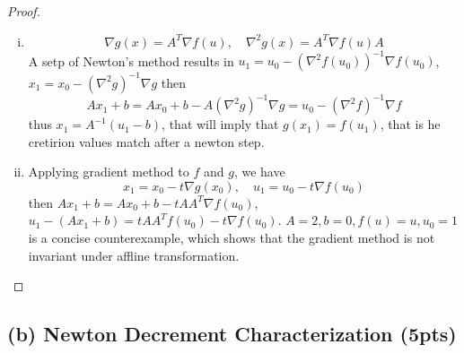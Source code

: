 \documentclass{article}
\theoremstyle{remark}
\theoremstyle{definition}
\begin{document}
\begin{proof}
\begin{enumerate}[(i)]
    \item  \[\nabla g(x) = A^T \nabla f(u),\quad \nabla^2 g(x) = A^T\nabla f(u)A \]
    A setp of Newton's method results in $u_1=u_0 - (\nabla^2 f(u_0))^{-1}\nabla f(u_0)$, $x_1 = x_0 - (\nabla^2 g)^{-1}\nabla g$
    then \[Ax_1+b = Ax_0+b -A(\nabla^2 g)^{-1}\nabla g = u_0-(\nabla^2 f)^{-1}\nabla f  \]
    thus $x_1= A^{-1}(u_1-b)$, that will imply that $g(x_1)=f(u_1)$, that is he cretirion values match after a newton step.
    \item Applying gradient method to $f$ and $g$, we have 
    \[x_1 = x_0 -t\nabla g(x_0),\quad u_1 = u_0-t \nabla f(u_0)\]
    then $A x_1+b = Ax_0 +b -tAA^T\nabla f(u_0)$, $u_1-(Ax_1+b)=tAA^Tf(u_0)-t\nabla f(u_0)$.  $A=2,b=0,f(u)=u,u_0=1$ is a concise counterexample, which shows that the gradient method is not invariant under affline transformation.
\end{enumerate}

\end{proof}









\subsection*{(b) Newton Decrement Characterization (5pts)}
\end{document}
